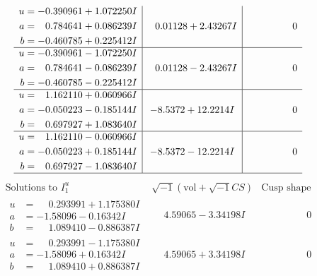 \documentclass[1p]{elsarticle_modified}
\theoremstyle{definition}
\newcommand{\I}{\sqrt{-1}}
\begin{document}
$$\begin{array}{c|c|c}
\begin{aligned}
u &= -0.390961 + 1.072250 I \\
a &= \phantom{-}0.784641 + 0.086239 I \\
b &= -0.460785 + 0.225412 I\end{aligned}
 & \phantom{-}0.01128 + 2.43267 I & \phantom{-0.000000 } 0 \\ \hline\begin{aligned}
u &= -0.390961 - 1.072250 I \\
a &= \phantom{-}0.784641 - 0.086239 I \\
b &= -0.460785 - 0.225412 I\end{aligned}
 & \phantom{-}0.01128 - 2.43267 I & \phantom{-0.000000 } 0 \\ \hline\begin{aligned}
u &= \phantom{-}1.162110 + 0.060966 I \\
a &= -0.050223 - 0.185144 I \\
b &= \phantom{-}0.697927 + 1.083640 I\end{aligned}
 & -8.5372 + 12.2214 I & \phantom{-0.000000 } 0 \\ \hline\begin{aligned}
u &= \phantom{-}1.162110 - 0.060966 I \\
a &= -0.050223 + 0.185144 I \\
b &= \phantom{-}0.697927 - 1.083640 I\end{aligned}
 & -8.5372 - 12.2214 I & \phantom{-0.000000 } 0\\
 \hline 
 \end{array}$$\newpage$$\begin{array}{c|c|c}  
\text{Solutions to }I^u_{1}& \I (\text{vol} + \sqrt{-1}CS) & \text{Cusp shape}\\
 \hline 
\begin{aligned}
u &= \phantom{-}0.293991 + 1.175380 I \\
a &= -1.58096 - 0.16342 I \\
b &= \phantom{-}1.089410 - 0.886387 I\end{aligned}
 & \phantom{-}4.59065 - 3.34198 I & \phantom{-0.000000 } 0 \\ \hline\begin{aligned}
u &= \phantom{-}0.293991 - 1.175380 I \\
a &= -1.58096 + 0.16342 I \\
b &= \phantom{-}1.089410 + 0.886387 I\end{aligned}
 & \phantom{-}4.59065 + 3.34198 I & \phantom{-0.000000 } 0 \\ \hline\begin{aligned}

\end{aligned}
\end{array}$$
\end{document}
